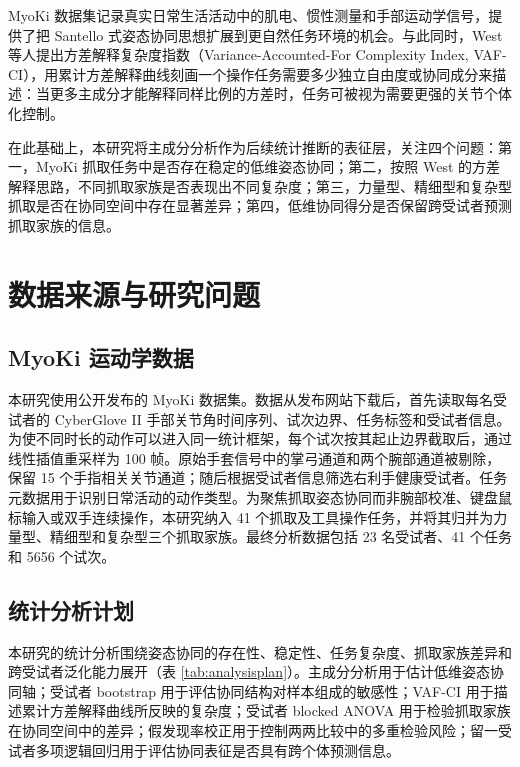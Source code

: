 \documentclass[10pt,a4paper]{ctexart}
\begin{document}
MyoKi 数据集记录真实日常生活活动中的肌电、惯性测量和手部运动学信号，提供了把 Santello 式姿态协同思想扩展到更自然任务环境的机会\cite{andreas2025}。与此同时，West 等人提出方差解释复杂度指数（Variance-Accounted-For Complexity Index, VAF-CI），用累计方差解释曲线刻画一个操作任务需要多少独立自由度或协同成分来描述：当更多主成分才能解释同样比例的方差时，任务可被视为需要更强的关节个体化控制\cite{west2025}。

在此基础上，本研究将主成分分析作为后续统计推断的表征层，关注四个问题：第一，MyoKi 抓取任务中是否存在稳定的低维姿态协同；第二，按照 West 的方差解释思路，不同抓取家族是否表现出不同复杂度；第三，力量型、精细型和复杂型抓取是否在协同空间中存在显著差异；第四，低维协同得分是否保留跨受试者预测抓取家族的信息。

\section{数据来源与研究问题}
\subsection{MyoKi 运动学数据}
本研究使用公开发布的 MyoKi 数据集\cite{andreas2025}。数据从发布网站下载后，首先读取每名受试者的 CyberGlove II 手部关节角时间序列、试次边界、任务标签和受试者信息。为使不同时长的动作可以进入同一统计框架，每个试次按其起止边界截取后，通过线性插值重采样为 100 帧。原始手套信号中的掌弓通道和两个腕部通道被剔除，保留 15 个手指相关关节通道；随后根据受试者信息筛选右利手健康受试者。任务元数据用于识别日常活动的动作类型。为聚焦抓取姿态协同而非腕部校准、键盘鼠标输入或双手连续操作，本研究纳入 41 个抓取及工具操作任务，并将其归并为力量型、精细型和复杂型三个抓取家族。最终分析数据包括 23 名受试者、41 个任务和 5656 个试次。

\subsection{统计分析计划}
本研究的统计分析围绕姿态协同的存在性、稳定性、任务复杂度、抓取家族差异和跨受试者泛化能力展开（表 \ref{tab:analysisplan}）。主成分分析用于估计低维姿态协同轴；受试者 bootstrap 用于评估协同结构对样本组成的敏感性；VAF-CI 用于描述累计方差解释曲线所反映的复杂度；受试者 blocked ANOVA 用于检验抓取家族在协同空间中的差异；假发现率校正用于控制两两比较中的多重检验风险；留一受试者多项逻辑回归用于评估协同表征是否具有跨个体预测信息。
\end{document}
